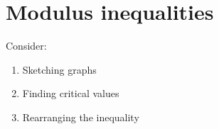 \section{Modulus inequalities}
Consider:
\begin{enumerate}
    \item Sketching graphs
    \item Finding critical values
    \item Rearranging the inequality
\end{enumerate}